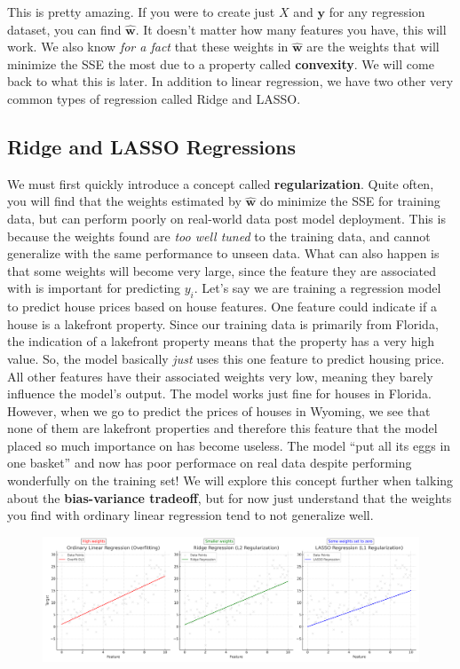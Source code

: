 \begin{flushleft}
    This is pretty amazing. If you were to create just $X$ and $\textbf{y}$ for any regression dataset, you can find $\hat{\textbf{w}}$. It doesn't matter how many features you have, this will work. We also know \textit{for a fact} that these weights in $\hat{\textbf{w}}$ are the weights that will minimize the SSE the most due to a property called \textbf{convexity}. We will come back to what this is later. In addition to linear regression, we have two other very common types of regression called Ridge and LASSO.
\end{flushleft}

\subsection{Ridge and LASSO Regressions}
\begin{flushleft}
    \large We must first quickly introduce a concept called \textbf{regularization}. Quite often, you will find that the weights estimated by $\hat{\textbf{w}}$ do minimize the SSE for training data, but can perform poorly on real-world data post model deployment. This is because the weights found are \textit{too well tuned} to the training data, and cannot generalize with the same performance to unseen data. What can also happen is that some weights will become very large, since the feature they are associated with is important for predicting $y_i$. Let's say we are training a regression model to predict house prices based on house features. One feature could indicate if a house is a lakefront property. Since our training data is primarily from Florida, the indication of a lakefront property means that the property has a very high value. So, the model basically \textit{just} uses this one feature to predict housing price. All other features have their associated weights very low, meaning they barely influence the model's output. The model works just fine for houses in Florida. However, when we go to predict the prices of houses in Wyoming, we see that none of them are lakefront properties and therefore this feature that the model placed so much importance on has become useless. The model ``put all its eggs in one basket'' and now has poor performace on real data despite performing wonderfully on the training set! We will explore this concept further when talking about the \textbf{bias-variance tradeoff}, but for now just understand that the weights you find with ordinary linear regression tend to not generalize well. \break

    \begin{figure}[H]
        \centering
        \includegraphics[width=0.85\linewidth]{ml/regression_comparison.png}
        \label{fig:regression_comparison}
    \end{figure}
    

\end{flushleft}
